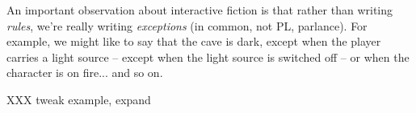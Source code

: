 An important observation about interactive fiction is that rather than
writing {\em rules}, we're really writing {\em exceptions} (in common, not
PL, parlance). For example, we might like to say that the cave is dark,
except when the player carries a light source -- except when the light source
is switched off -- or when the character is on fire... and so on.

XXX tweak example, expand
